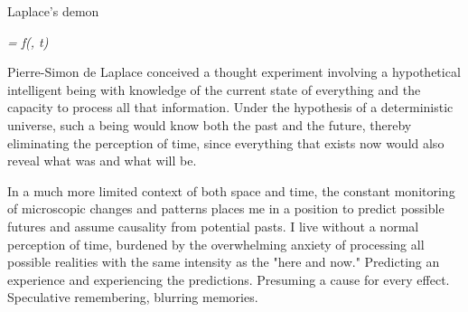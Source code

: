 

\begin{center}
\vspace*{\fill}
\Huge{Laplace's demon}

\vspace{2cm}

\begin{flushright}
\large{
\textit{  = f(, t)}}
\end{flushright}

\vspace*{\fill}
\end{center}


Pierre-Simon de Laplace conceived a thought experiment involving a hypothetical intelligent being with knowledge of the current state of everything and the capacity to process all that information. Under the hypothesis of a deterministic universe, such a being would know both the past and the future, thereby eliminating the perception of time, since everything that exists now would also reveal what was and what will be.

In a much more limited context of both space and time, the constant monitoring of microscopic changes and patterns places me in a position to predict possible futures and assume causality from potential pasts. I live without a normal perception of time, burdened by the overwhelming anxiety of processing all possible realities with the same intensity as the "here and now." Predicting an experience and experiencing the predictions. Presuming a cause for every effect. Speculative remembering, blurring memories.
